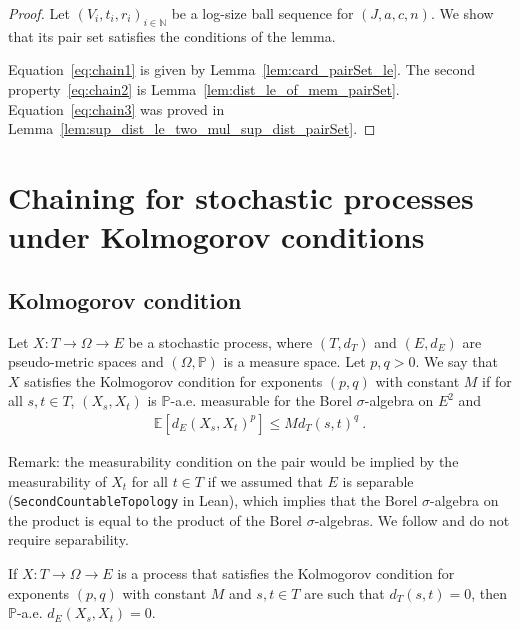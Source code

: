 \begin{proof}\leanok
Let $(V_i, t_i, r_i)_{i \in \mathbb{N}}$ be a log-size ball sequence for $(J, a, c, n)$. We show that its pair set satisfies the conditions of the lemma.

Equation~\eqref{eq:chain1} is given by Lemma~\ref{lem:card_pairSet_le}.
The second property~\eqref{eq:chain2} is Lemma~\ref{lem:dist_le_of_mem_pairSet}.
Equation~\eqref{eq:chain3} was proved in Lemma~\ref{lem:sup_dist_le_two_mul_sup_dist_pairSet}.
\end{proof}





\section{Chaining for stochastic processes under Kolmogorov conditions}

\subsection{Kolmogorov condition}

\begin{definition}\label{def:IsKolmogorovProcess}
  \leanok
Let $X : T \to \Omega \to E$ be a stochastic process, where $(T, d_T)$ and $(E, d_E)$ are pseudo-metric spaces and $(\Omega, \mathbb{P})$ is a measure space.
Let $p, q > 0$.
We say that $X$ satisfies the Kolmogorov condition for exponents $(p,q)$ with constant $M$ if for all $s, t \in T$, $(X_s, X_t)$ is $\mathbb{P}$-a.e. measurable for the Borel $\sigma$-algebra on $E^2$ and
\begin{align*}
  \mathbb{E}[d_E(X_s, X_t)^p] \le M d_T(s, t)^q
  \: .
\end{align*}
\end{definition}

Remark: the measurability condition on the pair would be implied by the measurability of $X_t$ for all $t \in T$ if we assumed that $E$ is separable (\texttt{SecondCountableTopology} in Lean), which implies that the Borel $\sigma$-algebra on the product is equal to the product of the Borel $\sigma$-algebras.
We follow \cite{kratschmer2023kolmogorov} and do not require separability.


\begin{lemma}\label{lem:IsKolmogorovProcess.edist_eq_zero}
  \leanok
If $X : T \to \Omega \to E$ is a process that satisfies the Kolmogorov condition for exponents $(p,q)$ with constant $M$ and $s, t \in T$ are such that $d_T(s, t) = 0$, then $\mathbb{P}$-a.e. $d_E(X_s, X_t) = 0$.
\end{lemma}

